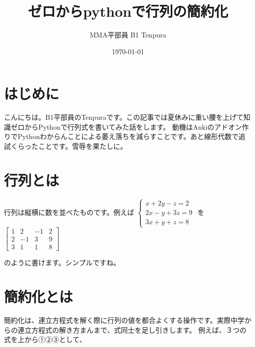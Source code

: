 \documentclass[lualatex,paper=a4paper]{jlreq}
\title{ゼロからpythonで行列の簡約化} %
\author{MMA平部員 B1 Tenpura} %
\date{\today}
\begin{document}

\maketitle %
\section{はじめに}
こんにちは。B1平部員のTenpuraです。この記事では夏休みに重い腰を上げて知識ゼロからPythonで行列式を書いてみた話をします。
動機はAnkiのアドオン作りでPythonわからんことによる萎え落ちを減らすことです。あと線形代数で追試くらったことです。雪辱を果たしに。

\section{行列とは}
行列は縦横に数を並べたものです。例えば
$\begin{cases}
        x + 2y - z = 2  \\
        2x - y + 3z = 9 \\
        3x + y + z = 8
    \end{cases}$
を
$\begin{bmatrix}
        1 & 2  & -1 & 2 \\
        2 & -1 & 3  & 9 \\
        3 & 1  & 1  & 8
    \end{bmatrix}$

のように書けます。シンプルですね。

\section{簡約化とは}
簡約化は、連立方程式を解く際に行列の値を都合よくする操作です。実際中学からの連立方程式の解き方まんまで、式同士を足し引きします。
例えば、３つの式を上から①②③として、
\end{document}

